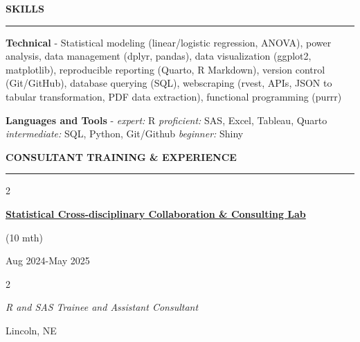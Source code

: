 \documentclass[
  16,
]{article}
\begin{document}
\vspace{3pt}

\begin{large}{\bf SKILLS}
  \vspace{3pt}
  \hrule
\end{large}
\vspace{-0.16cm}

\textbf{Technical} - Statistical modeling (linear/logistic regression,
ANOVA), power analysis, data management (dplyr, pandas), data
visualization (ggplot2, matplotlib), reproducible reporting (Quarto, R
Markdown), version control (Git/GitHub), database querying (SQL),
webscraping (rvest, APIs, JSON to tabular transformation, PDF data
extraction), functional programming (purrr)

\textbf{Languages and Tools} - \emph{expert:} R \emph{proficient:} SAS,
Excel, Tableau, Quarto \emph{intermediate:} SQL, Python, Git/Github
\emph{beginner:} Shiny

\vspace{3pt}

\clearpage

\begin{large}{\bf CONSULTANT TRAINING \& EXPERIENCE}
  \vspace{3pt}
  \hrule  
  \begin{multicols}{2}
    \begin{flushleft}{\bf \href{https://statistics.unl.edu/sc3lhelp-desk}{Statistical Cross-disciplinary Collaboration \& Consulting Lab}}\end{flushleft}
    \begin{flushright}
    \begin{small}(10 mth)\end{small}
    Aug 2024-May 2025\end{flushright}
  \end{multicols}
  \vspace{-0.17cm}
  \begin{multicols}{2}
    \begin{flushleft}\textit{R and SAS Trainee and Assistant Consultant}\end
    {flushleft}\begin{flushright}Lincoln, NE\end
    {flushright}
  \end{multicols}
\end{large}
\vspace{-0.16cm}
\end{document}
